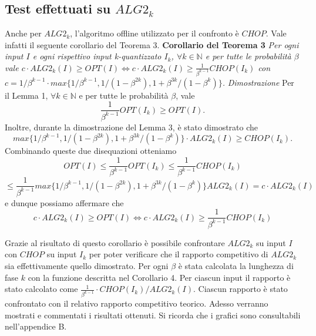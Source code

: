 \documentclass[12pt]{article}
\newcommand*{\N}{\mathbb{N}}
\begin{document}
\subsection{Test effettuati su $ALG2_{k}$}
Anche per $ALG2_{k}$, l’algoritmo offline utilizzato per il confronto è $CHOP$. Vale infatti il seguente corollario del Teorema 3.
\newline\newline
\textbf{Corollario del Teorema 3}
\textit{Per ogni input $I$ e ogni rispettivo input k-quantizzato $I_{k}$, $\forall k \in \N$ e per tutte le probabilità $\beta$ vale
$c \cdot ALG2_{k}(I) \geq OPT(I) \iff c \cdot ALG2_{k}(I) \geq \frac{1}{\beta^{k-1}} CHOP(I_{k})$ con $c = 1 / \beta^{k - 1} \cdot max \{1 / \beta^{k - 1}, 1 / (1 - \beta^{2k}), 1 + \beta^{3k} / (1 - \beta^{k})\}$.}
\newline \newline
\textit{Dimostrazione} 
Per il Lemma 1, $\forall k \in \N$ e per tutte le probabilità $\beta$, vale $$\frac{1}{\beta^{k-1}} OPT(I_{k}) \geq OPT(I).$$
Inoltre, durante la dimostrazione del Lemma 3, è stato dimostrato che $$max \{1 / \beta^{k - 1}, 1 / (1 - \beta^{2k}), 1 + \beta^{3k} / (1 - \beta^{k})\} \cdot ALG2_{k}(I) \geq CHOP(I_{k}).$$
Combinando queste due disequazioni otteniamo
$$OPT(I) \leq \frac{1}{\beta^{k-1}} OPT(I_{k}) \leq \frac{1}{\beta^{k-1}} CHOP(I_{k})$$ $$\leq \frac{1}{\beta^{k-1}} max \{1 / \beta^{k - 1}, 1 / (1 - \beta^{2k}), 1 + \beta^{3k} / (1 - \beta^{k})\} ALG2_{k}(I) = c \cdot ALG2_{k}(I)$$
e dunque possiamo affermare che
\begin{equation}
c \cdot ALG2_{k}(I) \geq OPT(I) \iff c \cdot ALG2_{k}(I) \geq \frac{1}{\beta^{k-1}} CHOP(I_{k}) \tag*{$\square$}
\end{equation}

Grazie al risultato di questo corollario è possibile confrontare $ALG2_{k}$ su input $I$ con $CHOP$ su input $I_{k}$ per poter verificare che il rapporto competitivo di $ALG2_{k}$ sia effettivamente quello dimostrato. Per ogni $\beta$ è stata calcolata la lunghezza di fase $k$ con la funzione descritta nel Corollario 4. Per ciascun input il rapporto è stato calcolato come $\frac{1}{\beta^{k-1}} \cdot CHOP(I_{k}) / ALG2_{k}(I)$. Ciascun rapporto è stato confrontato con il relativo rapporto competitivo teorico. Adesso verranno mostrati e commentati i risultati ottenuti. Si ricorda che i grafici sono consultabili nell'appendice B.
\end{document}
